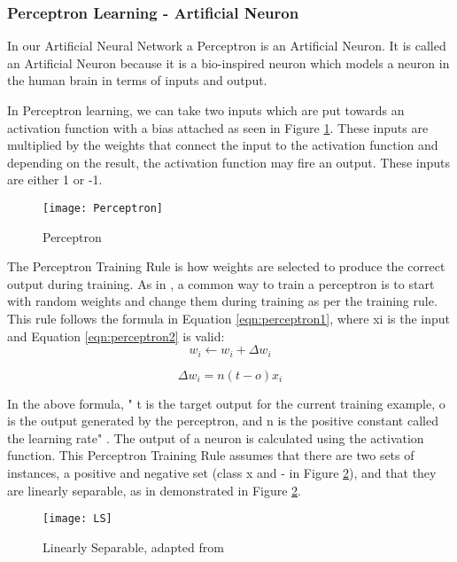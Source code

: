 \tocless\subsubsection{Perceptron Learning - Artificial Neuron}
In our Artificial Neural Network a Perceptron is an Artificial Neuron.
It is called an Artificial Neuron because it is a bio-inspired neuron which models
a neuron in the human brain in terms of inputs and output.

In Perceptron learning, we can take two inputs which are put towards an
activation function with a bias attached as seen in Figure \ref{fig:perceptron}.
These inputs are multiplied by the weights that connect the input to the
activation function and depending on the result, the activation function may
fire an output. These inputs are either 1 or -1.

\begin{figure}[h]
	\centering
     \texttt{[image: Perceptron]}
     \caption{Perceptron}
     \label{fig:perceptron}
\end{figure}

The Perceptron Training Rule is how weights are selected to produce the correct output during training.
As in \parencite{MLANN}, a common way to train a perceptron is to start with random weights and change them during training as per the training rule.
This rule follows the formula in Equation \ref{eqn:perceptron1}, where xi is the input and Equation \ref{eqn:perceptron2} is valid:
\begin{equation}\label{eqn:perceptron1}
    w_{i} \leftarrow w_{i} + \Delta w_{i}
\end{equation}

\begin{equation}\label{eqn:perceptron2}
    \Delta w_{i} = n(t-o)x_{i}
\end{equation}

In the above formula, " t is the target output for the current training example, o is the output generated by the perceptron, and n is the positive constant called the learning rate" \parencite{MLANN}.
The output of a neuron is calculated using the activation function.
This Perceptron Training Rule assumes that there are two sets of instances, a
positive and negative set (class x and - in Figure \ref{fig:ls}), and that they are linearly separable, as in demonstrated in Figure \ref{fig:ls}. 

\begin{figure}[h]
	\centering
    \texttt{[image: LS]}
     \caption{Linearly Separable, adapted from \parencite{MLANN}}
     \label{fig:ls}
\end{figure}

